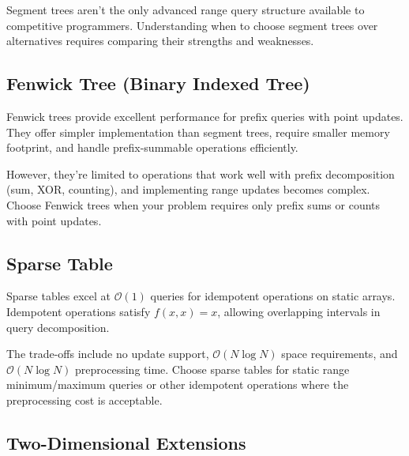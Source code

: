 Segment trees aren't the only advanced range query structure available to competitive programmers. Understanding when to choose segment trees over alternatives requires comparing their strengths and weaknesses.

\subsection{Fenwick Tree (Binary Indexed Tree)}


Fenwick trees provide excellent performance for prefix queries with point updates. They offer simpler implementation than segment trees, require smaller memory footprint, and handle prefix-summable operations efficiently.

However, they're limited to operations that work well with prefix decomposition (sum, XOR, counting), and implementing range updates becomes complex. Choose Fenwick trees when your problem requires only prefix sums or counts with point updates.

\subsection{Sparse Table}


Sparse tables excel at $\mathcal{O}(1)$ queries for idempotent operations on static arrays. Idempotent operations satisfy $f(x, x) = x$, allowing overlapping intervals in query decomposition.

The trade-offs include no update support, $\mathcal{O}(N \log N)$ space requirements, and $\mathcal{O}(N \log N)$ preprocessing time. Choose sparse tables for static range minimum/maximum queries or other idempotent operations where the preprocessing cost is acceptable.

\subsection{Two-Dimensional Extensions}

